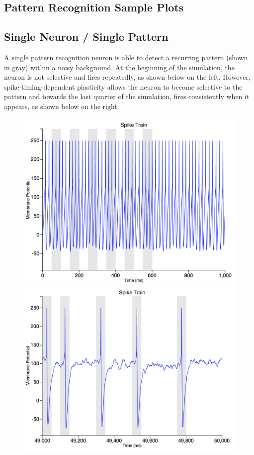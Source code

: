 \documentclass[a4paper,11pt]{article}
\begin{document}
\begin{appendices}
\section{Pattern Recognition Sample Plots}
\subsection{Single Neuron / Single Pattern}
A single pattern recognition neuron is able to detect a recurring pattern (shown in gray) within a noisy background. At the beginning of the simulation, the neuron is not selective and fires repeatedly, as shown below on the left. However, spike-timing-dependent plasticity allows the neuron to become selective to the pattern and towards the last quarter of the simulation, fires consistently when it appears, as shown below on the right. \\

\begin{figure}[h]
\centering
\includegraphics[scale = 0.3]{single_pattern_beginning}
\includegraphics[scale = 0.3]{single_pattern_end} \\
\end{figure}


\end{appendices}
\end{document}
